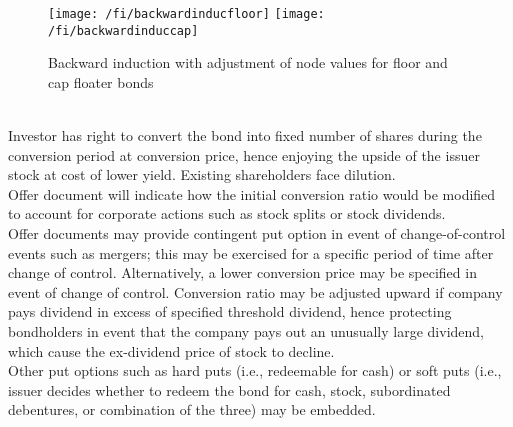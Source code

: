 \begin{figure}[H]
\centering
\texttt{[image: /fi/backwardinducfloor]}
\texttt{[image: /fi/backwardinduccap]}
\caption{Backward induction with adjustment of node values for floor and cap floater bonds}
\end{figure}

\begin{remark} \\
Investor has right to convert the bond into fixed number of shares during the conversion period at conversion price, hence enjoying the upside of the issuer stock at cost of lower yield. Existing shareholders face dilution.\\
Offer document will indicate how the initial conversion ratio would be modified to account for corporate actions such as stock splits or stock dividends. \\
Offer documents may provide contingent put option in event of change-of-control events such as mergers; this may be exercised for a specific period of time after change of control. Alternatively, a lower conversion price may be specified in event of change of control. Conversion ratio may be adjusted upward if company pays dividend in excess of specified threshold dividend, hence protecting bondholders in event that the company pays out an unusually large dividend, which cause the ex-dividend price of stock to decline.\\
Other put options such as hard puts (i.e., redeemable for cash) or soft puts (i.e., issuer decides whether to redeem the bond for cash, stock, subordinated debentures, or combination of the three) may be embedded.
\end{remark}

